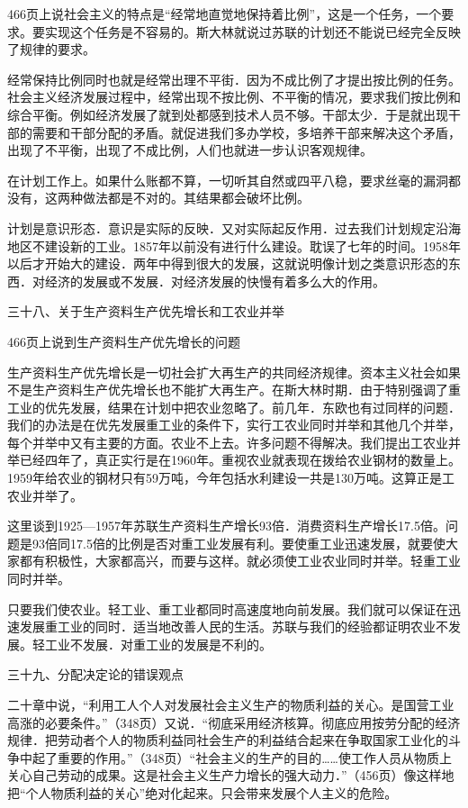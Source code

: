 466页上说社会主义的特点是“经常地直觉地保持着比例”，这是一个任务，一个要求。要实现这个任务是不容易的。斯大林就说过苏联的计划还不能说已经完全反映了规律的要求。

经常保持比例同时也就是经常出理不平街．因为不成比例了才提出按比例的任务。社会主义经济发展过程中，经常出现不按比例、不平衡的情况，要求我们按比例和综合平衡。例如经济发展了就到处都感到技术人员不够。干部太少．于是就出现干部的需要和干部分配的矛盾。就促进我们多办学校，多培养干部来解决这个矛盾，出现了不平衡，出现了不成比例，人们也就进一步认识客观规律。

在计划工作上。如果什么账都不算，一切听其自然或四平八稳，要求丝毫的漏洞都没有，这两种做法都是不对的。其结果都会破坏比例。

计划是意识形态．意识是实际的反映．又对实际起反作用．过去我们计划规定沿海地区不建设新的工业。1857年以前没有进行什么建设。耽误了七年的时间。1958年以后才开始大的建设．两年中得到很大的发展，这就说明像计划之类意识形态的东西．对经济的发展或不发展．对经济发展的快慢有着多么大的作用。

三十八、关于生产资料生产优先增长和工农业并举

466页上说到生产资料生产优先增长的问题

生产资料生产优先增长是一切社会扩大再生产的共同经济规律。资本主义社会如果不是生产资料生产优先增长也不能扩大再生产。在斯大林时期．由于特别强调了重工业的优先发展，结果在计划中把农业忽略了。前几年．东欧也有过同样的问题．我们的办法是在优先发展重工业的条件下，实行工农业同时并举和其他几个并举，每个并举中又有主要的方面。农业不上去。许多问题不得解决。我们提出工农业并举已经四年了，真正实行是在1960年。重视农业就表现在拨给农业钢材的数量上。1959年给农业的钢材只有59万吨，今年包括水利建设一共是130万吨。这算正是工农业并举了。

这里谈到1925---1957年苏联生产资料生产增长93倍．消费资料生产增长17.5倍。问题是93倍同17.5倍的比例是否对重工业发展有利。要使重工业迅速发展，就要使大家都有积极性，大家都高兴，而要与这样。就必须使工业农业同时并举。轻重工业同时并举。

只要我们使农业。轻工业、重工业都同时高速度地向前发展。我们就可以保证在迅速发展重工业的同时．适当地改善人民的生活。苏联与我们的经验都证明农业不发展。轻工业不发展．对重工业的发展是不利的。

三十九、分配决定论的错误观点

二十章中说，“利用工人个人对发展社会主义生产的物质利益的关心。是国营工业高涨的必要条件。”（348页）又说．“彻底采用经济核算。彻底应用按劳分配的经济规律．把劳动者个人的物质利益同社会生产的利益结合起来在争取国家工业化的斗争中起了重要的作用。”（348页）“社会主义的生产的目的……使工作人员从物质上关心自己劳动的成果。这是社会主义生产力增长的强大动力．”（456页）像这样地把“个人物质利益的关心”绝对化起来。只会带来发展个人主义的危险。

